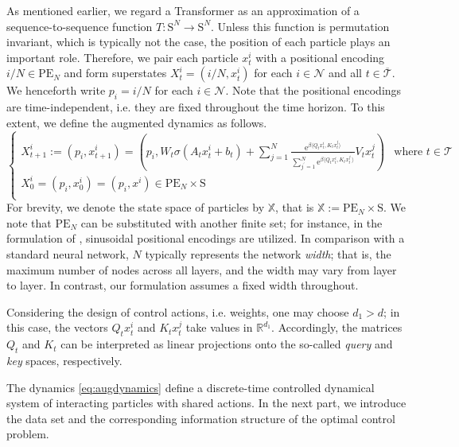 \documentclass[11pt]{article}
\newcommand{\XX}{\mathbb{X}}
\newcommand{\cN}{\mathcal{N}}
\newcommand{\cT}{\mathcal{T}}
\newcommand{\inner}[2]{\langle#1, #2\rangle}
\newcommand{\e}{\mathrm{e}} %
\begin{document}
As mentioned earlier, we regard a Transformer as an approximation of a sequence-to-sequence function $T:\mathrm{S}^N\to\mathrm{S}^N$. Unless this function is permutation invariant, which is typically not the case, the position of each particle plays an important role. Therefore, we pair each particle $x_t^i$ with a positional encoding $i/N\in\mathrm{PE}_N$ and form superstates $X_t^i = (i/N, x_t^i)$ for each $i\in\cN$ and all $t\in\overline{\cT}$. We henceforth write $p_i = i/N$ for each $i\in\cN$. Note that the positional encodings are time-independent, i.e. they are fixed throughout the time horizon. To this extent, we define the augmented dynamics as follows.
\begin{equation}\label{eq:augdynamics}
    \begin{cases}
        \displaystyle X_{t+1}^i := (p_i,x_{t+1}^i) = \left(p_i,W_t\sigma(A_tx_t^i + b_t) + \sum_{j=1}^N \frac{ \e^{\beta\inner{Q_tx_t^i}{K_tx_t^j}}}{\sum_{j^\prime=1}^N\e^{\beta\inner{Q_tx_t^i}{K_tx_t^{j^\prime}}}}V_tx_t^j\right) & \text{where } t\in\cT \\
        \displaystyle X_0^i = (p_i,x^i_0) = (p_i,x^i) \in \mathrm{PE}_N\times\mathrm{S}\\ 
    \end{cases}
\end{equation}
For brevity, we denote the state space of particles by $\XX$, that is $\XX := \mathrm{PE}_N\times\mathrm{S}$. We note that $\mathrm{PE}_N$ can be substituted with another finite set; for instance,  in the formulation of \cite{vaswani2017attention}, sinusoidal positional encodings are utilized. In comparison with a standard neural network, \(N\) typically represents the network \emph{width}; that is, the maximum number of nodes across all layers, and the width may vary from layer to layer. In contrast, our formulation assumes a fixed width throughout.

Considering the design of control actions, i.e. weights, one may choose \(d_1 > d\); in this case, the vectors \(Q_t x_t^i\) and \(K_t x_t^j\) take values in \(\mathbb{R}^{d_1}\). Accordingly, the matrices \(Q_t\) and \(K_t\) can be interpreted as linear projections onto the so-called \emph{query} and \emph{key} spaces, respectively. 

The dynamics \eqref{eq:augdynamics} define a discrete-time controlled dynamical system of interacting particles with shared actions. In the next part, we introduce the data set and the corresponding information structure of the optimal control problem.
\end{document}
